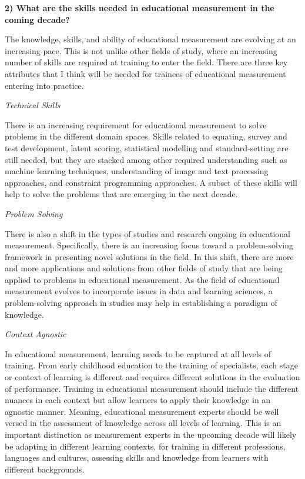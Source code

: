 \documentclass[
]{book}
\begin{document}
\textbf{2) What are the skills needed in educational measurement in the coming decade?}

The knowledge, skills, and ability of educational measurement are evolving at an increasing pace. This is not unlike other fields of study, where an increasing number of skills are required at training to enter the field. There are three key attributes that I think will be needed for trainees of educational measurement entering into practice.

\emph{Technical Skills}

There is an increasing requirement for educational measurement to solve problems in the different domain spaces. Skills related to equating, survey and test development, latent scoring, statistical modelling and standard-setting are still needed, but they are stacked among other required understanding such as machine learning techniques, understanding of image and text processing approaches, and constraint programming approaches. A subset of these skills will help to solve the problems that are emerging in the next decade.

\emph{Problem Solving}

There is also a shift in the types of studies and research ongoing in educational measurement. Specifically, there is an increasing focus toward a problem-solving framework in presenting novel solutions in the field. In this shift, there are more and more applications and solutions from other fields of study that are being applied to problems in educational measurement. As the field of educational measurement evolves to incorporate issues in data and learning sciences, a problem-solving approach in studies may help in establishing a paradigm of knowledge.

\emph{Context Agnostic}

In educational measurement, learning needs to be captured at all levels of training. From early childhood education to the training of specialists, each stage or context of learning is different and requires different solutions in the evaluation of performance. Training in educational measurement should include the different nuances in each context but allow learners to apply their knowledge in an agnostic manner. Meaning, educational measurement experts should be well versed in the assessment of knowledge across all levels of learning. This is an important distinction as measurement experts in the upcoming decade will likely be adapting in different learning contexts, for training in different professions, languages and cultures, assessing skills and knowledge from learners with different backgrounds.
\end{document}
